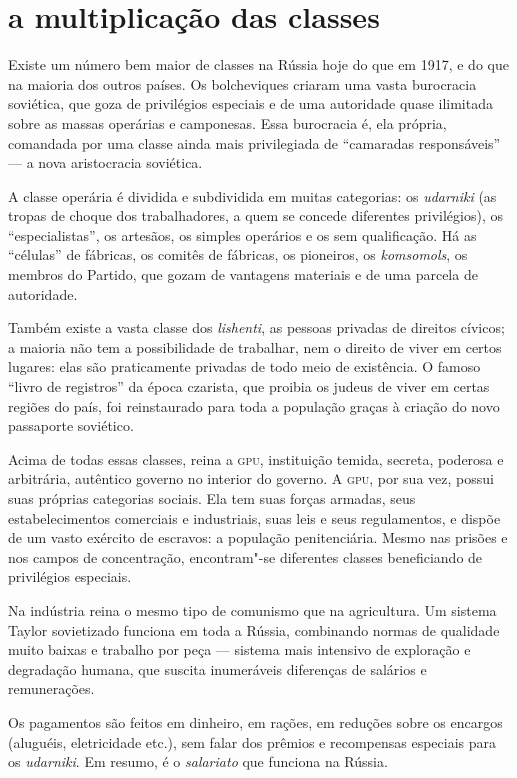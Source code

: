 \section*{a multiplicação das classes}
Existe um número bem maior de classes na Rússia hoje do que em 1917, e
do que na maioria dos outros países. Os bolcheviques criaram uma vasta
burocracia soviética, que goza de privilégios especiais e de uma
autoridade quase ilimitada sobre as massas operárias e camponesas. Essa
burocracia é, ela própria, comandada por uma classe ainda mais
privilegiada de “camaradas responsáveis” --- a nova aristocracia
soviética.

A classe operária é dividida e subdividida em muitas categorias: os
\textit{udarniki} (as tropas de choque dos trabalhadores, a quem se concede
diferentes privilégios), os “especialistas”, os artesãos, os simples
operários e os sem qualificação. Há as “células” de fábricas, os
comitês de fábricas, os pioneiros, os \textit{komsomols}, os membros do Partido,
que gozam de vantagens materiais e de uma parcela de autoridade.

Também existe a vasta classe dos \textit{lishenti}, as pessoas privadas de
direitos cívicos; a maioria não tem a possibilidade de trabalhar,
nem o direito de viver em certos lugares: elas são praticamente
privadas de todo meio de existência. O famoso “livro de registros” da época
czarista, que proibia os judeus de viver em certas regiões do país, foi
reinstaurado para toda a população graças à criação do novo passaporte
soviético.

Acima de todas essas classes, reina a \textsc{gpu}, instituição temida,
secreta, poderosa e arbitrária, autêntico governo no interior do
governo. A \textsc{gpu}, por sua vez, possui suas próprias categorias
sociais. Ela tem suas forças armadas, seus estabelecimentos comerciais
e industriais, suas leis e seus regulamentos, e dispõe de um vasto
exército de escravos: a população penitenciária. Mesmo nas prisões e
nos campos de concentração, encontram"-se diferentes classes
beneficiando de privilégios especiais.

Na indústria reina o mesmo tipo de comunismo que na agricultura. Um
sistema Taylor sovietizado funciona em toda a Rússia, combinando normas
de qualidade muito baixas e trabalho por peça --- sistema mais
intensivo de exploração e degradação humana, que suscita inumeráveis
diferenças de salários e remunerações.

Os pagamentos são feitos em dinheiro, em rações, em reduções sobre os
encargos (aluguéis, eletricidade etc.), sem falar dos prêmios e
recompensas especiais para os \textit{udarniki}. Em resumo, é o \textit{salariato} que 
funciona na Rússia.

